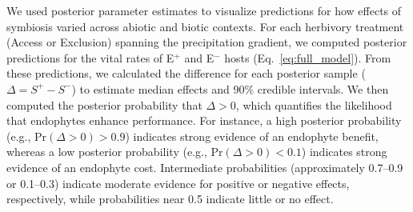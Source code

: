 \documentclass[12pt]{article}\usepackage[]{graphicx}\usepackage[dvipsnames]{xcolor}
\newcommand{\tom}[2]{{\color{red}{#1}}\footnote{\textit{\color{red}{#2}}}}
\begin{document}
We used posterior parameter estimates to visualize predictions for how effects of symbiosis varied across abiotic and biotic contexts. 
For each herbivory treatment (Access or Exclusion) spanning the precipitation gradient, we computed posterior predictions for the vital rates of E$^+$ and E$^-$ hosts (Eq.~\ref{eq:full_model}).  
From these predictions, we calculated the difference for each posterior sample ($\Delta = S^+ - S^-$) to estimate median effects and 90\% credible intervals.  
We then computed the posterior probability that $\Delta > 0$, which quantifies the likelihood that endophytes enhance performance. 
For instance, a high posterior probability (e.g., Pr$(\Delta>0) >0.9$) indicates strong evidence of an endophyte benefit, whereas a low posterior probability (e.g., Pr$(\Delta>0) <0.1$) indicates strong evidence of an endophyte cost. 
Intermediate probabilities (approximately 0.7–0.9 or 0.1–0.3) indicate moderate evidence for positive or negative effects, respectively, while probabilities near 0.5 indicate little or no effect.
\end{document}
